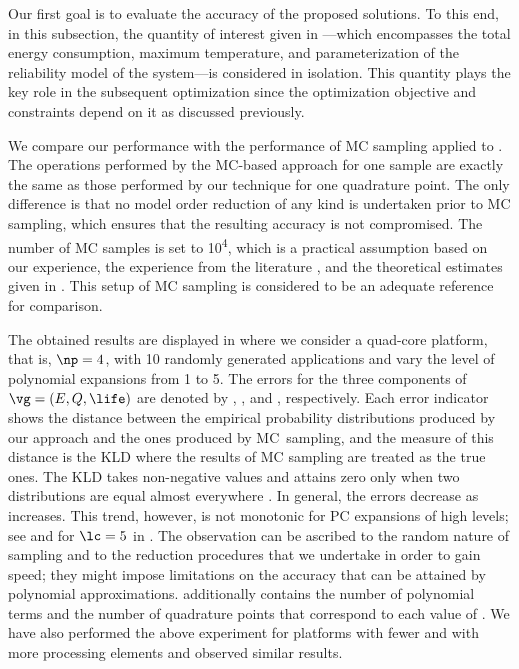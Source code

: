 Our first goal is to evaluate the accuracy of the proposed solutions. To this
end, in this subsection, the quantity of interest given in
---which encompasses the total energy
consumption, maximum temperature, and parameterization of the reliability model
of the system---is considered in isolation. This quantity plays the key role in
the subsequent optimization since the optimization objective and constraints
depend on it as discussed previously.

We compare our performance with the performance of \ac{MC} sampling applied to
. The operations performed by the
\ac{MC}-based approach for one sample are exactly the same as those performed by
our technique for one quadrature point. The only difference is that no model
order reduction of any kind is undertaken prior to \ac{MC} sampling, which
ensures that the resulting accuracy is not compromised. The number of \ac{MC}
samples is set to 10\textsuperscript{4}, which is a practical assumption based
on our experience, the experience from the literature \cite{xiang2010, juan2012,
lee2013}, and the theoretical estimates given in \cite{diaz-emparanza2002}. This
setup of \ac{MC} sampling is considered to be an adequate reference for
comparison.

The obtained results are displayed in  where
we consider a quad-core platform, that is, $\np = 4$, with 10 randomly generated
applications and vary the level of polynomial expansions \lc from 1 to 5. The
errors for the three components of $\vg = (E, Q, \life)$ are denoted by
, , and \error{\life}, respectively. Each error indicator
shows the distance between the empirical probability distributions produced by
our approach and the ones produced by \ac{MC}\ sampling, and the measure of this
distance is the \ac{KLD} \cite{gelman2013, hastie2013} where the results of
\ac{MC} sampling are treated as the true ones. The \ac{KLD} takes non-negative
values and attains zero only when two distributions are equal almost everywhere
\cite{durrett2010}. In general, the errors decrease as \lc increases. This
trend, however, is not monotonic for \ac{PC} expansions of high levels; see
 and \error{\life} for $\lc = 5$ in .
The observation can be ascribed to the random nature of sampling and to the
reduction procedures that we undertake in order to gain speed; they might impose
limitations on the accuracy that can be attained by polynomial approximations.
 additionally contains the number of
polynomial terms \nc and the number of quadrature points \nq that correspond to
each value of \lc. We have also performed the above experiment for platforms
with fewer and with more processing elements and observed similar results.

